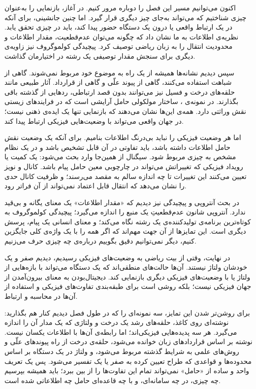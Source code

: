اکنون می‌توانیم مسیر این فصل را دوباره مرور کنیم. در آغاز، بازنمایی را به‌عنوان چیزی شناختیم که می‌تواند به‌جای چیز دیگری قرار گیرد. اما چنین جانشینی، برای آنکه در یک ارتباط واقعی یا درون یک دستگاه حضور پیدا کند، باید در چیزی تحقق یابد. نظریه‌ی اطلاعات به ما نشان داد که چگونه می‌توان عدم‌قطعیت، مقدار اطلاعات و محدودیت انتقال را به زبان ریاضی توصیف کرد. پیچیدگی کولموگروف نیز زاویه‌ی دیگری برای سنجش مقدار توصیفی یک رشته در اختیارمان گذاشت.

سپس دیدیم نشانه‌ها همیشه از یک راه به موضوع خود مربوط نمی‌شوند. گاهی از شباهت استفاده می‌کنند، گاهی از پیوند علّی و گاهی از قرارداد. آثار طبیعی مانند حلقه‌های درخت و فسیل نیز می‌توانند بدون قصد ارتباطی، ردهایی از گذشته باقی بگذارند. در نمونه‌ی ، ساختار مولکولی حامل آرایشی است که در فرایندهای زیستی نقش وراثتی دارد. همه‌ی این‌ها نشان می‌دهند که بازنمایی تنها یک ایده‌ی ذهنی نیست؛ در جهان واقعی می‌تواند با وضعیت‌هایی فیزیکی ارتباط پیدا کند.

اما هر وضعیت فیزیکی را نباید بی‌درنگ اطلاعات بنامیم. برای آنکه یک وضعیت نقش حامل اطلاعات داشته باشد، باید تفاوتی در آن قابل تشخیص باشد و در یک نظام مشخص به چیزی مربوط شود. سیگنال از همین‌جا وارد بحث می‌شود: یک کمیت یا رویداد فیزیکی که تغییراتش می‌تواند در چارچوبی معین حامل پیام باشد. کانال و نویز تعیین می‌کنند این تغییرات تا چه اندازه سالم به مقصد می‌رسند؛ و ظرفیت کانال حدی را نشان می‌دهد که انتقال قابل اعتماد نمی‌تواند از آن فراتر رود.

در بحث آنتروپی و پیچیدگی نیز دیدیم که «مقدار اطلاعات» یک معنای یگانه و بی‌قید ندارد. آنتروپی شانون عدم‌قطعیتِ یک منبع را اندازه می‌گیرد؛ پیچیدگی کولموگروف به کوتاه‌ترین برنامه‌ی تولیدکننده‌ی یک رشته نگاه می‌کند؛ و معنای انسانی یک پیام، پرسش دیگری است. این تمایزها از آن جهت مهم‌اند که اگر همه را با یک واژه‌ی کلی جایگزین کنیم، دیگر نمی‌توانیم دقیق بگوییم درباره‌ی چه چیزی حرف می‌زنیم.

در نهایت، وقتی از بیت ریاضی به وضعیت‌های فیزیکی رسیدیم، دیدیم صفر و یک خودشان ولتاژ نیستند. آن‌ها حالت‌های منطقی‌اند که یک دستگاه می‌تواند با بازه‌هایی از ولتاژ یا با وضعیت‌های فیزیکی دیگری بازنمایی کند. دیجیتال‌بودن به معنای بیرون‌آمدن از جهان فیزیکی نیست؛ بلکه روشی است برای طبقه‌بندی تفاوت‌های فیزیکی و استفاده از آن‌ها در محاسبه و ارتباط.

برای روشن‌تر شدن این تمایز، سه نمونه‌ای را که در طول فصل دیدیم کنار هم بگذارید: نوشته‌ای روی کاغذ، حلقه‌های رشد یک درخت و ولتاژی که یک مدار آن را اندازه می‌گیرد. هر سه پدیده‌هایی فیزیکی‌اند؛ اما رابطه‌ی آن‌ها با اطلاعات یکسان نیست. نوشته بر اساس قراردادهای زبان خوانده می‌شود، حلقه‌ی درخت از راه پیوندهای علّی و روش‌های علمی به شرایط گذشته مربوط می‌شود، و ولتاژ در یک دستگاه بر اساس محدوده‌ها و قواعدی که طراح تعیین کرده به صفر یا یک تفسیر می‌شود. پس یک تعریف واحد و ساده از «حامل» نمی‌تواند تمام این تفاوت‌ها را از بین ببرد؛ باید همیشه بپرسیم چه چیزی، در چه سامانه‌ای، و با چه قاعده‌ای حامل چه اطلاعاتی شده است.

